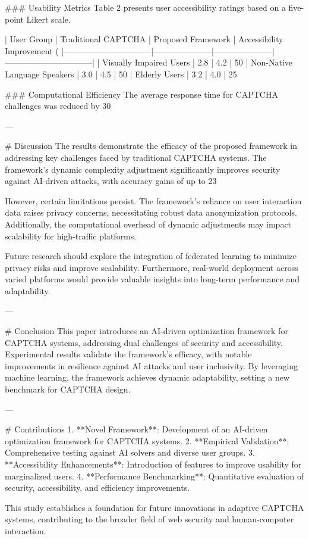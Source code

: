 ### Usability Metrics  
Table 2 presents user accessibility ratings based on a five-point Likert scale.

| User Group                     | Traditional CAPTCHA | Proposed Framework | Accessibility Improvement (%
|--------------------------------|---------------------|---------------------|--------------------------------|
| Visually Impaired Users        | 2.8                | 4.2                | 50%
| Non-Native Language Speakers   | 3.0                | 4.5                | 50%
| Elderly Users                  | 3.2                | 4.0                | 25%

### Computational Efficiency  
The average response time for CAPTCHA challenges was reduced by 30%

---

# Discussion  
The results demonstrate the efficacy of the proposed framework in addressing key challenges faced by traditional CAPTCHA systems. The framework's dynamic complexity adjustment significantly improves security against AI-driven attacks, with accuracy gains of up to 23%

However, certain limitations persist. The framework's reliance on user interaction data raises privacy concerns, necessitating robust data anonymization protocols. Additionally, the computational overhead of dynamic adjustments may impact scalability for high-traffic platforms.

Future research should explore the integration of federated learning to minimize privacy risks and improve scalability. Furthermore, real-world deployment across varied platforms would provide valuable insights into long-term performance and adaptability.

---

# Conclusion  
This paper introduces an AI-driven optimization framework for CAPTCHA systems, addressing dual challenges of security and accessibility. Experimental results validate the framework's efficacy, with notable improvements in resilience against AI attacks and user inclusivity. By leveraging machine learning, the framework achieves dynamic adaptability, setting a new benchmark for CAPTCHA design.

---

# Contributions  
1. **Novel Framework**: Development of an AI-driven optimization framework for CAPTCHA systems.  
2. **Empirical Validation**: Comprehensive testing against AI solvers and diverse user groups.  
3. **Accessibility Enhancements**: Introduction of features to improve usability for marginalized users.  
4. **Performance Benchmarking**: Quantitative evaluation of security, accessibility, and efficiency improvements.  

This study establishes a foundation for future innovations in adaptive CAPTCHA systems, contributing to the broader field of web security and human-computer interaction.